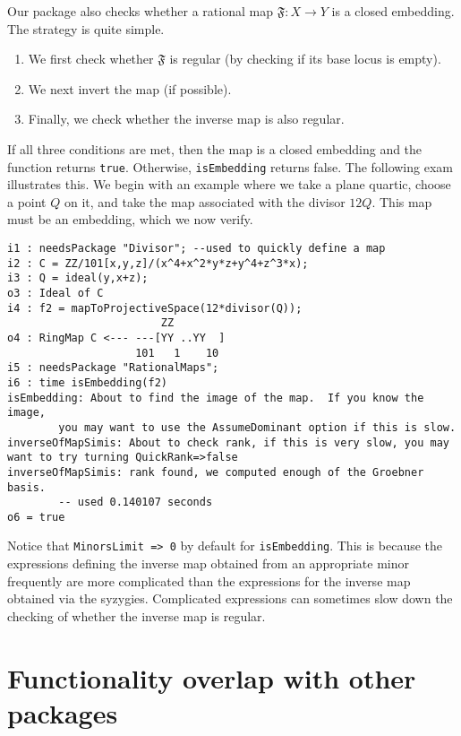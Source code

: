 \documentclass[11pt]{amsart}%
\numberwithin{equation}{theorem}
\renewcommand{\:}{\colon}
\theoremstyle{theorem}
\begin{document}
{{Our package also checks whether a rational map $\mathfrak{F} : X \to Y$ is a closed embedding.  The strategy is quite simple.
\begin{enumerate}
\item  We first check whether $\mathfrak{F}$ is regular (by checking if its base locus is empty).
\item  We next invert the map (if possible).
\item  Finally, we check whether the inverse map is also regular.
\end{enumerate}
If all three conditions are met, then the map is a closed embedding and the function returns {\tt true}.  Otherwise, {\tt isEmbedding} returns false.
The following exam illustrates this.  We begin with an example where we take a plane quartic, choose a point $Q$ on it, and take the map associated with 
the divisor $12 Q$.  This map must be an embedding, which we now verify.
}
{\scriptsize
\color{blue}\begin{verbatim}
i1 : needsPackage "Divisor"; --used to quickly define a map                                           
i2 : C = ZZ/101[x,y,z]/(x^4+x^2*y*z+y^4+z^3*x);
i3 : Q = ideal(y,x+z);
o3 : Ideal of C
i4 : f2 = mapToProjectiveSpace(12*divisor(Q));
                        ZZ
o4 : RingMap C <--- ---[YY ..YY  ]                                                                    
                    101   1    10
i5 : needsPackage "RationalMaps";
i6 : time isEmbedding(f2)
isEmbedding: About to find the image of the map.  If you know the image,
        you may want to use the AssumeDominant option if this is slow.
inverseOfMapSimis: About to check rank, if this is very slow, you may want to try turning QuickRank=>false
inverseOfMapSimis: rank found, we computed enough of the Groebner basis.
        -- used 0.140107 seconds                                                                         
o6 = true    
\end{verbatim}
}
{\color{black}\normalsize%
\noindent
Notice that {\tt MinorsLimit => 0} by default for {\tt isEmbedding}.  This is because the expressions defining the inverse map obtained from
an appropriate minor frequently are more complicated than the expressions for the inverse map obtained via the syzygies.  Complicated expressions can sometimes slow down the checking of whether the inverse map is regular.

\section{Functionality overlap with other packages}

}}
\end{document}
